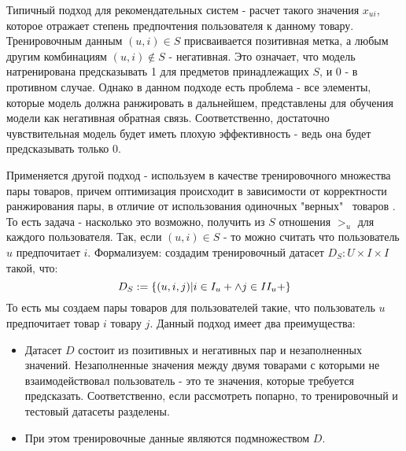 \documentclass[14pt]{mmcs_article}
\begin{document}
Типичный подход для рекомендательных систем - расчет такого значения $x_{ui}$, которое отражает степень предпочтения пользователя к данному товару. Тренировочным данным $(u,i) \in S$ присваивается позитивная метка, а любым другим комбинациям $(u,i) \notin S$ - негативная. Это означает, что модель натренирована предсказывать 1 для предметов принадлежащих $S$, и 0 - в противном случае. Однако в данном подходе есть проблема - все элементы, которые модель должна ранжировать в дальнейшем, представлены для обучения модели как негативная обратная связь. Соответственно, достаточно чувствительная модель будет иметь плохую эффективность - ведь она будет предсказывать только 0.    

 Применяется другой подход - используем в качестве тренировочного множества пары товаров, причем оптимизация происходит в зависимости от корректности ранжирования пары, в отличие от использования одиночных "верных" \  товаров \cite{BPR:1205}. То есть задача - насколько это возможно, получить из $S$ отношения $>_u$ для каждого пользователя. Так, если $ (u,i) \in S $ - то можно считать что пользователь $ u $ предпочитает $ i $. Формализуем: создадим тренировочный датасет $ D_S: U \times I \times I $ такой, что:
\begin{equation}
	D_S := \{ (u,i,j) | i \in I_u+ \wedge j \in I \\I_u+ \}
\end{equation}
То есть мы создаем пары товаров для пользователей такие, что пользователь $ u $ предпочитает товар $ i $ товару $ j $.
Данный подход имеет два преимущества:
\begin{itemize}
	\item Датасет $D$ состоит из позитивных и негативных пар и незаполненных значений. Незаполненные значения между двумя товарами с которыми не взаимодействовал пользователь - это те значения, которые требуется предсказать. Соответственно, если рассмотреть попарно, то тренировочный и тестовый датасеты разделены.
	\item При этом тренировочные данные являются подмножеством $D$. 
\end{itemize}     
\end{document}
